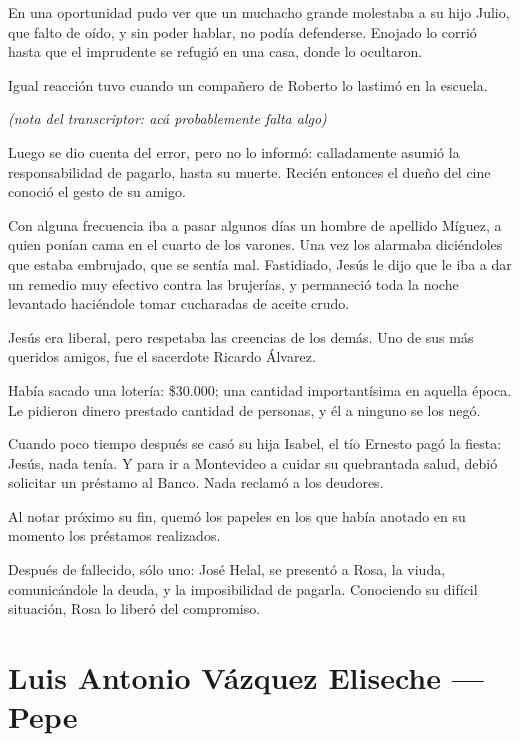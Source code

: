 \documentclass[a4paper]{article}
\begin{document}
\bigbreak{}

En una oportunidad pudo ver que un muchacho grande molestaba a su hijo Julio, que falto de oído, y sin poder hablar, no podía defenderse. Enojado lo corrió hasta que el imprudente se refugió en una casa, donde lo ocultaron.

Igual reacción tuvo cuando un compañero de Roberto lo lastimó en la escuela.

\bigbreak{}

\emph{(nota del transcriptor: acá probablemente falta algo)}

\bigbreak{}

Luego se dio cuenta del error, pero no lo informó: calladamente asumió la responsabilidad de pagarlo, hasta su muerte. Recién entonces el dueño del cine conoció el gesto de su amigo.

Con alguna frecuencia iba a pasar algunos días un hombre de apellido Mí\-guez, a quien ponían cama en el cuarto de los varones. Una vez los alarmaba di\-cién\-do\-les que estaba embrujado, que se sentía mal. Fastidiado, Jesús le dijo que le iba a dar un remedio muy efectivo contra las brujerías, y permaneció toda la noche levantado haciéndole tomar cucharadas de aceite crudo.

\bigbreak{} 

Jesús era liberal, pero respetaba las creencias de los demás. Uno de sus más queridos amigos, fue el sacerdote Ricardo Álvarez.

\bigbreak{}

Había sacado una lotería: \$30.000; una cantidad importantísima en aquella época. Le pidieron dinero prestado cantidad de personas, y él a ninguno se los negó.

Cuando poco tiempo después se casó su hija Isabel, el tío Ernesto pagó la fiesta: Jesús, nada tenía. Y para ir a Montevideo a cuidar su quebrantada salud, debió solicitar un préstamo al Banco. Nada reclamó a los deudores.

Al notar próximo su fin, quemó los papeles en los que había anotado en su momento los préstamos realizados.

Después de fallecido, sólo uno: José Helal, se presentó a Rosa, la viuda, comunicándole la deuda, y la imposibilidad de pagarla. Conociendo su difícil situación, Rosa lo liberó del compromiso.


\section{Luis Antonio Vázquez Eliseche --- Pepe}
\end{document}
